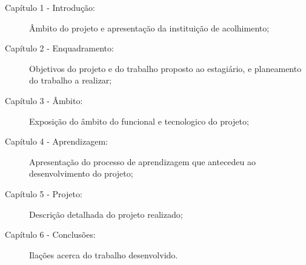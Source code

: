 \begin{description}
  \item[Capítulo 1 - Introdução:] Âmbito do projeto e apresentação da instituição de acolhimento;
  \item[Capítulo 2 - Enquadramento:] Objetivos do projeto e do trabalho proposto ao estagiário, e planeamento do trabalho a realizar;
  \item[Capítulo 3 - Âmbito:] Exposição do âmbito do funcional e tecnologico do projeto;
  \item[Capítulo 4 - Aprendizagem:] Apresentação do processo de aprendizagem que antecedeu ao desenvolvimento do projeto;
  \item[Capítulo 5 - Projeto:] Descrição detalhada do projeto realizado;
  \item[Capítulo 6 - Conclusões:] Ilações acerca do trabalho desenvolvido.
\end{description}

